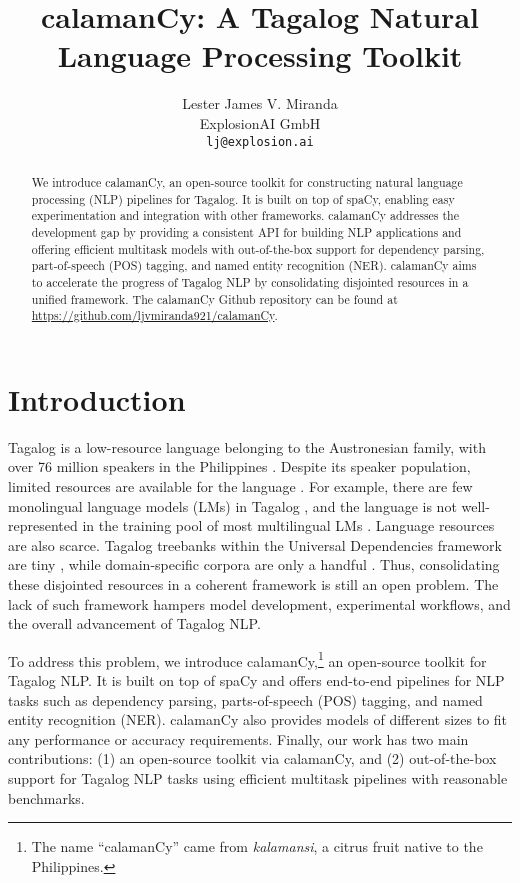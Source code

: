 \documentclass[11pt]{article}
\title{calamanCy: A Tagalog Natural Language Processing Toolkit}
\author{Lester James V. Miranda \\
  ExplosionAI GmbH \\
  \texttt{lj@explosion.ai}}
\begin{document}
\maketitle
\begin{abstract}
  We introduce calamanCy, an open-source toolkit for constructing natural language processing (NLP) pipelines for Tagalog.
  It is built on top of spaCy, enabling easy experimentation and integration with other frameworks.  
  calamanCy addresses the development gap by providing a consistent API for building NLP applications and offering efficient multitask models with out-of-the-box support for dependency parsing, part-of-speech (POS) tagging, and named entity recognition (NER).
  calamanCy aims to accelerate the progress of Tagalog NLP by consolidating disjointed resources in a unified framework.
  The calamanCy Github repository can be found at \url{https://github.com/ljvmiranda921/calamanCy}.
\end{abstract}

\section{Introduction}

Tagalog is a low-resource language belonging to the Austronesian family, with over 76 million speakers in the Philippines \citep{Lewis2009EthnologueL}.
Despite its speaker population, limited resources are available for the language \citep{Cruz2021ImprovingLL}. 
For example, there are few monolingual language models (LMs) in Tagalog \citep{Cruz2021ImprovingLL,Jiang2021PretrainedLM}, and the language is not well-represented in the training pool of most multilingual LMs \citep{Conneau2019UnsupervisedCR,Devlin2019BERTPO}. 
Language resources are also scarce.
Tagalog treebanks within the Universal Dependencies framework are tiny \citep{Samson2018TRG,Aquino2020ParsingIT}, 
while domain-specific corpora are only a handful \citep{Enriquez2023DeterminingLF,Livelo2018IntelligentDI}. 
Thus, consolidating these disjointed resources in a coherent framework is still an open problem.
The lack of such framework hampers model development, experimental workflows, and the overall advancement of Tagalog NLP.

To address this problem, we introduce calamanCy,\footnote[1]{
  The name ``calamanCy'' came from \textit{kalamansi}, a citrus fruit native to the Philippines.}
an open-source toolkit for Tagalog NLP. 
It is built on top of spaCy \citep{Honnibal2020Spacy} and offers end-to-end pipelines for NLP tasks such as dependency parsing, parts-of-speech (POS) tagging, and named entity recognition (NER). 
calamanCy also provides models of different sizes to fit any performance or accuracy requirements.
Finally, our work has two main contributions: (1) an open-source toolkit via calamanCy, and (2) out-of-the-box support for Tagalog NLP tasks using efficient multitask pipelines with reasonable benchmarks.
\end{document}

